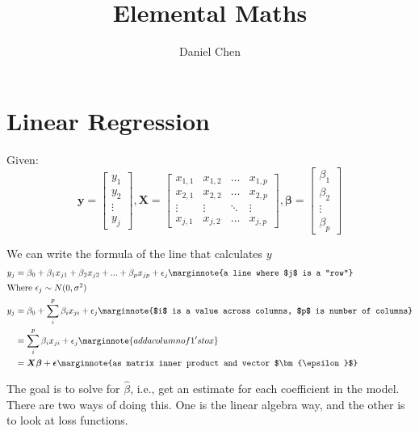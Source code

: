 \documentclass[10pt,letterpaper,twoside]{article}
\author{Daniel Chen}
\title{Elemental Maths}
\date{}
\begin{document}
    \maketitle
\section{Linear Regression}
Given:
\[
\bm{y} = 
    \begin{bmatrix}
        y_1\\
        y_2\\
        \vdots\\
        y_j
    \end{bmatrix}
,
\bm{X} =
    \begin{bmatrix}
        x_{1,1} & x_{1, 2} & \hdots & x_{1, p}\\
        x_{2,1} & x_{2, 2} & \hdots & x_{2, p}\\
        \vdots  & \vdots   & \ddots & \vdots\\
        x_{j,1} & x_{j, 2} & \hdots & x_{j, p}
    \end{bmatrix}
,
\bm{\beta} = 
    \begin{bmatrix}
        \beta_1\\
        \beta_2\\
        \vdots\\
        \beta_p
    \end{bmatrix}
\]

\vspace{.5cm}
We can write the formula of the line that calculates $y$
\begin{align}
    y_j &= \beta_0 + \beta_1 x_{j1} + \beta_2 x_{j2} + ... + \beta_p x_{jp} + \epsilon_j
          \marginnote{a line where $j$ is a "row"}\\
    \intertext{Where $\epsilon_j \sim N(0, \sigma^2$)}
    y_j &= \beta_0 + \sum_{i}^{p}\beta_i x_{ji} + \epsilon_j
          \marginnote{$i$ is a value across columns, $p$ is number of columns}\\
        &= \sum_{i}^{p}\beta_i x_{ji} + \epsilon_j
          \marginnote{add a column of 1's to x}\\
        &= \bm{X}\bm{\beta} + \bm{\epsilon}
          \marginnote{as matrix inner product and vector $\bm{\epsilon}$}
\end{align}

The goal is to solve for $\hat{\beta}$, i.e.,
get an estimate for each coefficient in the model.
There are two ways of doing this.
One is the linear algebra way, and the other is to look at loss functions.
\end{document}
